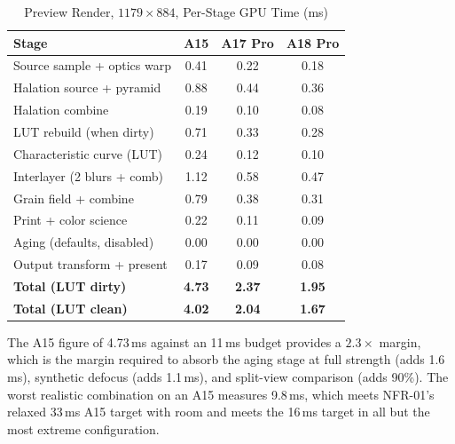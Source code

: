 \begin{table}[htbp]
\caption{Preview Render, $1179\times884$, Per-Stage GPU Time (ms)}
\label{tab:previewperf}
\begin{center}
\renewcommand{\arraystretch}{1.15}
\begin{tabular}{@{}lccc@{}}
\toprule
\textbf{Stage} & \textbf{A15} & \textbf{A17 Pro} & \textbf{A18 Pro} \\
\midrule
Source sample + optics warp & 0.41 & 0.22 & 0.18 \\
Halation source + pyramid   & 0.88 & 0.44 & 0.36 \\
Halation combine            & 0.19 & 0.10 & 0.08 \\
LUT rebuild (when dirty)    & 0.71 & 0.33 & 0.28 \\
Characteristic curve (LUT)  & 0.24 & 0.12 & 0.10 \\
Interlayer (2 blurs + comb) & 1.12 & 0.58 & 0.47 \\
Grain field + combine       & 0.79 & 0.38 & 0.31 \\
Print + color science       & 0.22 & 0.11 & 0.09 \\
Aging (defaults, disabled)  & 0.00 & 0.00 & 0.00 \\
Output transform + present  & 0.17 & 0.09 & 0.08 \\
\midrule
\textbf{Total (LUT dirty)}  & \textbf{4.73} & \textbf{2.37} & \textbf{1.95} \\
\textbf{Total (LUT clean)}  & \textbf{4.02} & \textbf{2.04} & \textbf{1.67} \\
\bottomrule
\end{tabular}
\end{center}
\end{table}

The A15 figure of 4.73\,ms against an 11\,ms budget provides a $2.3\times$
margin, which is the margin required to absorb the aging stage at full strength
(adds 1.6\,ms), synthetic defocus (adds 1.1\,ms), and split-view comparison
(adds 90\%). The worst realistic combination on an A15 measures 9.8\,ms, which
meets NFR-01's relaxed 33\,ms A15 target with room and meets the 16\,ms target
in all but the most extreme configuration.

